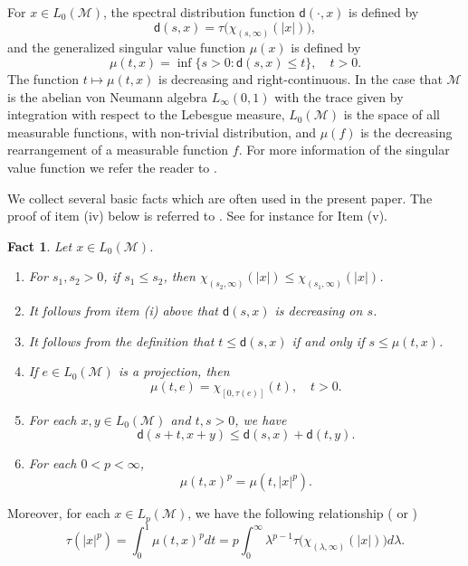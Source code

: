 \documentclass[11]{amsart}
\numberwithin{equation}{section}
\newtheorem{fact}[theorem]{Fact}
\newcommand{\M}{\mathcal{M}}
\begin{document}
For $x\in L_0({\M})$, the spectral distribution function $\mathsf{d}(\cdot,x)$ is defined by
$$\mathsf{d}(s,x)=\tau\big(\chi_{(s,\infty)}(|x|)\big),$$
and the generalized singular value function $\mu(x)$ is defined by
$$\mu(t,x)=\inf\big\{s>0:\mathsf{d}(s,x)\leq t\big\},\quad t>0.$$
The function $t\mapsto \mu(t,x)$ is decreasing and right-continuous.
In the case that $\mathcal{M}$ is the abelian von Neumann algebra $L_{\infty}(0,1)$ with the trace given by integration with respect to the Lebesgue measure,  $L_0(\mathcal{M})$ is the space of all measurable functions, with non-trivial distribution, and $\mu(f)$ is the decreasing rearrangement of a measurable function $f$. For  more information of the singular value function we refer the reader to \cite{Fa1986,DdePS2023}.

We collect several basic facts which are often used in the present paper. The proof of item (iv) below is referred to \cite[Proposition 3.2.10]{DdePS2023}. See for instance \cite[Lemma 2.1]{JRWZ2020} for Item (v). 
\begin{fact}\label{Fact 1}
	Let $x\in L_0(\mathcal{M})$.
	\begin{enumerate}[\rm (i)] 
		\item For $s_1,s_2>0$, if $s_1\leq s_2$, then $\chi_{(s_2,\infty)}(|x|)\leq \chi_{(s_1,\infty)}(|x|)$.
		\item It follows from item (i) above that $\mathsf{d}(s,x)$ is decreasing on $s$. 
		\item It follows from the definition that $t\leq \mathsf{d}(s,x)$ if and only if $s\leq \mu(t,x)$. 
		\item If $e\in L_0(\mathcal{M})$ is a projection, then 
		$$\mu(t,e)=\chi_{[0,\tau(e)]}(t),\quad t>0.$$
		\item For each $x,y\in L_0(\M)$ and $t,s>0$, we have
		$$\mathsf{d}(s+t,x+y)\leq \mathsf{d}(s,x)+\mathsf{d}(t,y).$$
		\item For each $0<p<\infty$,
		$$\mu(t,x)^p=\mu(t,|x|^p).$$
	\end{enumerate}
\end{fact}





Moreover, for each $x\in L_p(\mathcal{M})$, we have the following relationship (\cite[Proposition 3.3.9]{DdePS2023} or \cite[Corollary 2.8]{Fa1986})
\begin{equation}\label{eq FK 2}
	\tau(|x|^p)=\int_0^1 \mu(t,x)^pdt=p\int_{0}^\infty \lambda^{p-1}\tau\big(\chi_{(\lambda,\infty)}(|x|)\big) d\lambda.
\end{equation}
\end{document}
